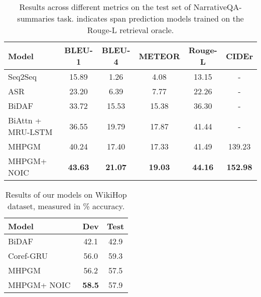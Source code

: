 \documentclass[11pt,a4paper]{article}
\newcommand{\baselineAbbv}{MHPGM}
\newcommand{\fullModel}{NOIC}
\begin{document}
\begin{table*}[t]
    \centering
    \begin{small}
    \begin{tabular}{lccccc}
    \toprule
    \textbf{Model} & \textbf{BLEU-1} & \textbf{BLEU-4} & \textbf{METEOR} & \textbf{Rouge-L} & \textbf{CIDEr}\\
    \midrule
    Seq2Seq \cite{kovcisky2017narrativeqa} & 15.89 & 1.26 & 4.08 & 13.15 & - \\
    ASR \cite{kovcisky2017narrativeqa} & 23.20 & 6.39 & 7.77 & 22.26 & -\\
    BiDAF \cite{kovcisky2017narrativeqa} & 33.72 & 15.53 & 15.38 & 36.30 & -\\
    BiAttn + MRU-LSTM \cite{tay2018multi} & 36.55 & 19.79 & 17.87 & 41.44 & -\\
    \midrule\midrule
    \baselineAbbv & 40.24 & 17.40 & 17.33 & 41.49 & 139.23 \\
    \baselineAbbv + \fullModel & \bf{43.63} & \bf{21.07} & \bf{19.03} & \bf{44.16} & \bf{152.98} \\
    \bottomrule
    \end{tabular}
    \end{small}
    \vspace{-5pt}
    \caption{Results across different metrics on the test set of NarrativeQA-summaries task.
     indicates span prediction models trained on the Rouge-L retrieval oracle.}
    \label{tab:resultsNQA}
    \vspace{-7pt}
\end{table*}
 \begin{table}[t]
	\centering
    \begin{small}
    \begin{tabular}{lcc} \toprule
    \textbf{Model} & \textbf{Dev} & \textbf{Test}\\\midrule
    BiDAF \cite{welbl2017constructing} & 42.1 & 42.9 \\
    Coref-GRU \cite{dhingra2018neural} & 56.0 & 59.3 \\
    \midrule
    \baselineAbbv & 56.2 & 57.5 \\
    \baselineAbbv + \fullModel\ & \bf 58.5 & 57.9 \\
    \bottomrule
    \end{tabular}
    \end{small}
    \vspace{-5pt}
    \caption{Results of our models on WikiHop dataset, measured in \% accuracy.}
    \label{tab:wikihop_results}
    \vspace{-8pt}
\end{table}
  
\end{document}
